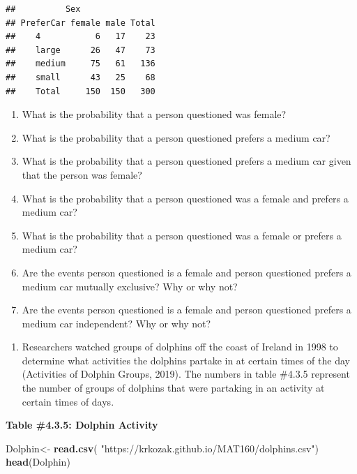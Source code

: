 \documentclass[
]{book}
\newenvironment{Shaded}{\begin{snugshade}}{\end{snugshade}}
\newcommand{\KeywordTok}[1]{\textcolor[rgb]{0.13,0.29,0.53}{\textbf{#1}}}
\newcommand{\NormalTok}[1]{#1}
\newcommand{\StringTok}[1]{\textcolor[rgb]{0.31,0.60,0.02}{#1}}
\providecommand{\tightlist}{%
  \setlength{\itemsep}{0pt}\setlength{\parskip}{0pt}}
\begin{document}
\begin{verbatim}
##          Sex
## PreferCar female male Total
##    4           6   17    23
##    large      26   47    73
##    medium     75   61   136
##    small      43   25    68
##    Total     150  150   300
\end{verbatim}

\begin{enumerate}
\def\labelenumi{\alph{enumi}.}
\tightlist
\item
  What is the probability that a person questioned was female?
\item
  What is the probability that a person questioned prefers a medium car?
\item
  What is the probability that a person questioned prefers a medium car given that the person was female?
\item
  What is the probability that a person questioned was a female and prefers a medium car?
\item
  What is the probability that a person questioned was a female or prefers a medium car?
\item
  Are the events person questioned is a female and person questioned prefers a medium car mutually exclusive? Why or why not?
\item
  Are the events person questioned is a female and person questioned prefers a medium car independent? Why or why not?
\end{enumerate}

\begin{enumerate}
\def\labelenumi{\arabic{enumi}.}
\setcounter{enumi}{11}
\tightlist
\item
  Researchers watched groups of dolphins off the coast of Ireland in 1998 to determine what activities the dolphins partake in at certain times of the day (Activities of Dolphin Groups, 2019). The numbers in
  table \#4.3.5 represent the number of groups of dolphins that were partaking in an activity at certain times of days.
\end{enumerate}

\textbf{Table \#4.3.5: Dolphin Activity}

\begin{Shaded}
\begin{Highlighting}[]
\NormalTok{Dolphin<-}\StringTok{ }\KeywordTok{read.csv}\NormalTok{(}
  \StringTok{"https://krkozak.github.io/MAT160/dolphins.csv"}\NormalTok{) }
\KeywordTok{head}\NormalTok{(Dolphin)}
\end{Highlighting}
\end{Shaded}
\end{document}
